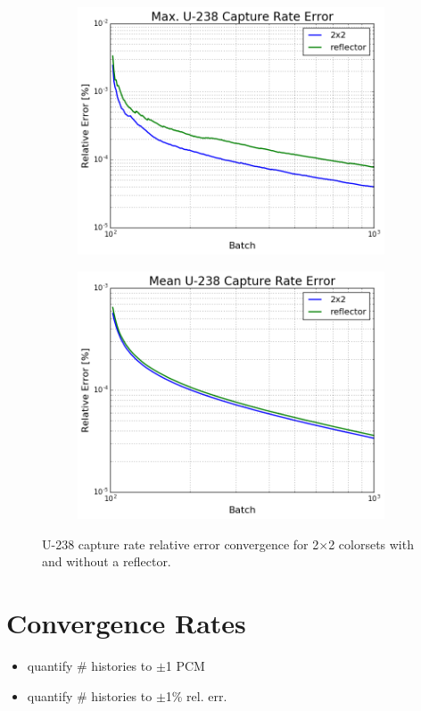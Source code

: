 \begin{figure}[h!]
\centering
\begin{subfigure}{0.5\textwidth}
  \centering
  \includegraphics[width=\linewidth]{figures/benchmarks/capture-rates/capt-conv-max-multi-assms}
  \caption{}
  \label{fig:chap7-capt-rate-max-conv-multi-assms}
\end{subfigure}%
\begin{subfigure}{0.5\textwidth}
  \centering
  \includegraphics[width=\linewidth]{figures/benchmarks/capture-rates/capt-conv-mean-multi-assms}
  \caption{}
  \label{fig:chap7-capt-rate-max-conv-multi-assms}
\end{subfigure}%
\caption[U-238 capture rate error convergence for 2$\times$2 colorsets]{U-238 capture rate relative error convergence for 2$\times$2 colorsets with and without a reflector.}
\label{fig:chap7-capt-rates-conv-assm}
\end{figure}

\section{Convergence Rates}
\label{subsec:chap7-convergence}

\begin{itemize}[noitemsep]
  \item quantify \# histories to $\pm$1 \ac{PCM}
  \item quantify \# histories to $\pm$1\% rel. err.
\end{itemize}